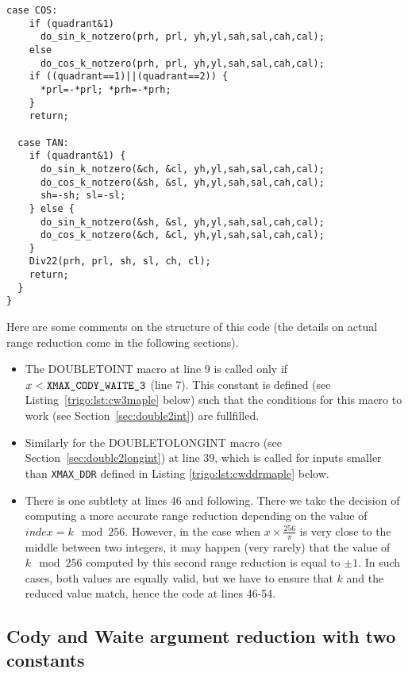 \begin{lstlisting}[caption={Multilevel argument reduction},firstnumber=1]
  case COS: 
    if (quadrant&1)   
      do_sin_k_notzero(prh, prl, yh,yl,sah,sal,cah,cal);
    else 
      do_cos_k_notzero(prh, prl, yh,yl,sah,sal,cah,cal);
    if ((quadrant==1)||(quadrant==2)) {
      *prl=-*prl; *prh=-*prh;
    }
    return;

  case TAN: 
    if (quadrant&1) {
      do_sin_k_notzero(&ch, &cl, yh,yl,sah,sal,cah,cal);
      do_cos_k_notzero(&sh, &sl, yh,yl,sah,sal,cah,cal);
      sh=-sh; sl=-sl;
    } else {
      do_sin_k_notzero(&sh, &sl, yh,yl,sah,sal,cah,cal);
      do_cos_k_notzero(&ch, &cl, yh,yl,sah,sal,cah,cal);
    }
    Div22(prh, prl, sh, sl, ch, cl);
    return;
  }
}

\end{lstlisting}
 

Here are some comments on the structure of this code (the details on
actual range reduction come in the following sections).

\begin{itemize}
\item The DOUBLETOINT macro at line 9 is called only if
  $x<\verb!XMAX_CODY_WAITE_3!$ (line 7). This constant is defined  (see
  Listing~\ref{trigo:lst:cw3maple} below) such
  that the conditions for this macro to work (see
  Section~\ref{sec:double2int}) are fullfilled. 

\item Similarly for the DOUBLETOLONGINT macro (see
  Section~\ref{sec:double2longint}) at line 39, which is called for
  inputs smaller than \verb!XMAX_DDR! defined in Listing
  \ref{trigo:lst:cwddrmaple} below.

\item There is one subtlety at lines 46 and following. There we take
  the decision of computing a more accurate range reduction depending
  on the value of $\mathit{index}=k\mod 256$. However, in the case
  when $x\times\frac{256}{\pi}$ is very close to the middle between
  two integers, it may happen (very rarely) that the value of $k\mod
  256$ computed by this second range reduction is equal to $\pm 1$. In
  such cases, both values are equally valid, but we have to ensure
  that $k$ and the reduced value match, hence the code at lines 46-54.
\end{itemize}



\subsection{Cody and Waite argument reduction with two constants}

